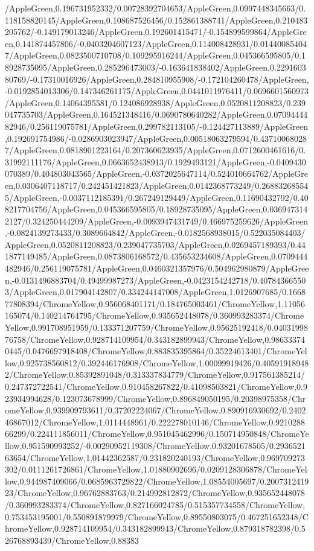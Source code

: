 {\begin{tikzternal}
/AppleGreen,0.196731952332/0.00728392704653/AppleGreen,0.0997448345663/0.118158820145/AppleGreen,0.108687526456/0.152861388741/AppleGreen,0.210483205762/-0.149179013246/AppleGreen,0.192601415471/-0.154899599864/AppleGreen,0.141874457806/-0.0403204607123/AppleGreen,0.114008428931/0.014400854047/AppleGreen,0.0823500710708/0.109295916244/AppleGreen,0.045366595805/0.18928735095/AppleGreen,0.285296473003/-0.163641838402/AppleGreen,0.229160380769/-0.17310016926/AppleGreen,0.284810955908/-0.172104260478/AppleGreen,-0.0192854013306/0.147346261175/AppleGreen,0.0441011976411/0.0696601560973/AppleGreen,0.14064395581/0.124086928938/AppleGreen,0.0520811208823/0.239047735703/AppleGreen,0.164521348416/0.0690780640282/AppleGreen,0.0709444482946/0.256119075781/AppleGreen,0.299782113105/-0.124427113889/AppleGreen,0.192691754986/-0.0286903023947/AppleGreen,0.00518063279594/0.437100680287/AppleGreen,0.0818901223164/0.207360623935/AppleGreen,0.0712600461616/0.31992111176/AppleGreen,0.0663652438913/0.1929493121/AppleGreen,-0.0409430070389/0.404803043565/AppleGreen,-0.0372025647114/0.524010664762/AppleGreen,0.0306407118717/0.242451421823/AppleGreen,0.0142368773249/0.268832685545/AppleGreen,-0.0037112185391/0.267249129449/AppleGreen,0.11690432792/0.408217704756/AppleGreen,0.045366595805/0.18928735095/AppleGreen,0.0369473142127/0.324250444209/AppleGreen,-0.0093947431749/0.466975259626/AppleGreen,-0.0824139273433/0.3089664842/AppleGreen,-0.0182568938015/0.522035084403/AppleGreen,0.0520811208823/0.239047735703/AppleGreen,0.0269457189393/0.441877149485/AppleGreen,0.0873806168572/0.435653234608/AppleGreen,0.0709444482946/0.256119075781/AppleGreen,0.0460321357976/0.504962980879/AppleGreen,-0.0131496883704/0.49499987273/AppleGreen,-0.0423154242718/0.407843665503/AppleGreen,0.017904142807/0.334244147008/AppleGreen,1.0126907685/0.166877808394/ChromeYellow,0.956068401171/0.184765003461/ChromeYellow,1.11056165074/0.140214764795/ChromeYellow,0.935652448078/0.360993283374/ChromeYellow,0.991708951959/0.133371207759/ChromeYellow,0.95625192418/0.0403199876758/ChromeYellow,0.928714109954/0.343182899943/ChromeYellow,0.986333740445/0.0476697918408/ChromeYellow,0.883835395864/0.35224613401/ChromeYellow,0.925738560812/0.392446176908/ChromeYellow,1.00099919426/0.405919189482/ChromeYellow,0.85392891048/0.313337834779/ChromeYellow,0.917561385214/0.247372722541/ChromeYellow,0.910458267822/0.41098503821/ChromeYellow,0.923934994628/0.123073678999/ChromeYellow,0.896849050195/0.20398975358/ChromeYellow,0.939909793611/0.37202224067/ChromeYellow,0.890916930692/0.240246867012/ChromeYellow,1.0114448961/0.222278010146/ChromeYellow,0.921028866299/0.224111856011/ChromeYellow,0.951045462996/0.150714950848/ChromeYellow,0.951590993252/-0.00290952119308/ChromeYellow,0.93201678505/0.293652163654/ChromeYellow,1.01442362587/0.231820240193/ChromeYellow,0.969709273302/0.0111261726861/ChromeYellow,1.01880902696/0.0209128306878/ChromeYellow,0.944987409066/0.0685963729822/ChromeYellow,1.08554005697/0.200731241923/ChromeYellow,0.96762883763/0.214992812872/ChromeYellow,0.935652448078/0.360993283374/ChromeYellow,0.827166024785/0.515357734558/ChromeYellow,0.753453195001/0.550891879979/ChromeYellow,0.89550803075/0.467251652348/ChromeYellow,0.928714109954/0.343182899943/ChromeYellow,0.879318782398/0.526768893439/ChromeYellow,0.88383
\end{tikzternal}}
